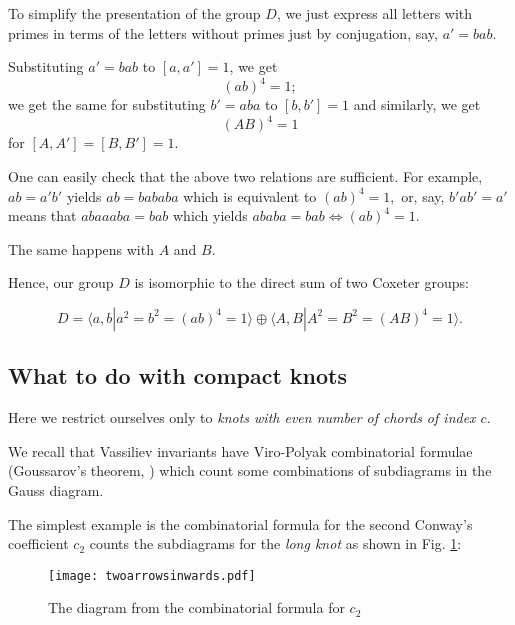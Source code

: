 \documentclass[12pt]{article}
\theoremstyle{definition}
\theoremstyle{remark}
\begin{document}
To simplify the presentation of the group $D$, we just express all letters with
primes in terms of the letters without primes just by conjugation, say, $a'=bab$.



Substituting $a'=bab$ to $[a,a']=1$, we get 
$$(ab)^{4}=1;$$ we get the same for
substituting $b'=aba$ to $[b,b']=1$ and similarly, we get
$$(AB)^{4}=1$$ for $[A,A']=[B,B']=1$.

One can easily check that the above two relations are sufficient.
For example, $ab=a'b'$ yields $ab=bababa$ which is equivalent to $(ab)^{4}=1,$
or, say,
$b'ab' = a'$ means that
$aba a aba = bab$ which yields $ababa = bab \Longleftrightarrow (ab)^{4} =1.$

The same happens with $A$ and $B$.

Hence, our group $D$ is isomorphic to the direct sum of two Coxeter groups:

$$ D = \langle a,b|a^{2}=b^{2}=(ab)^{4}=1\rangle \oplus \langle A,B|A^{2}=B^{2}= (AB)^{4}=1\rangle.$$

%




\subsection{What to do with compact knots}

Here we restrict ourselves only to {\em knots with even number of chords of index $c$}.


We recall that Vassiliev invariants have Viro-Polyak combinatorial formulae (Goussarov's theorem, \cite{GPV})
which count some combinations of subdiagrams in the Gauss diagram.

The simplest example is the combinatorial formula for the second Conway's coefficient $c_{2}$ 
counts the subdiagrams  for the {\em long knot} as shown in Fig. \ref{Fig1}:

\begin{figure}

\centering\texttt{[image: twoarrowsinwards.pdf]}
\caption{The diagram from the combinatorial formula for $c_{2}$}
\label{Fig1}
\end{figure}
\end{document}

